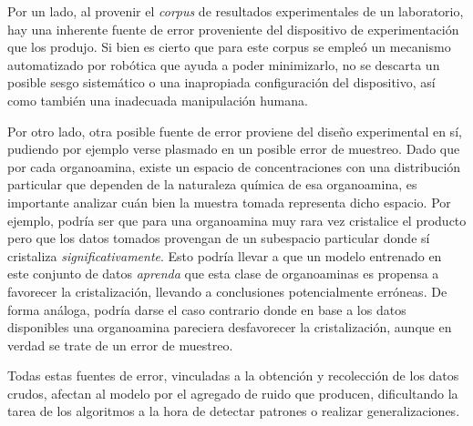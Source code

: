 
Por un lado, al provenir el \textit{corpus} de resultados experimentales de un laboratorio, hay una inherente fuente de error proveniente del dispositivo de experimentación que los produjo. Si bien es cierto que para este corpus se empleó un mecanismo automatizado por robótica que ayuda a poder minimizarlo, no se descarta un posible sesgo sistemático o una inapropiada configuración del dispositivo, así como también una inadecuada manipulación humana.

Por otro lado, otra posible fuente de error proviene del diseño experimental en sí, pudiendo por ejemplo verse plasmado en un posible error de muestreo. Dado que por cada organoamina, existe un espacio de concentraciones con una distribución particular que dependen de la naturaleza química de esa organoamina, es importante analizar cuán bien la muestra tomada representa dicho espacio. Por ejemplo, podría ser que para una organoamina muy rara vez cristalice el producto pero que los datos tomados provengan de un subespacio particular donde sí cristaliza \textit{significativamente}. Esto podría llevar a que un modelo entrenado en este conjunto de datos \textit{aprenda} que esta clase de organoaminas es propensa a favorecer la cristalización, llevando a conclusiones potencialmente erróneas. De forma análoga, podría darse el caso contrario donde en base a los datos disponibles una organoamina pareciera desfavorecer la cristalización, aunque en verdad se trate de un error de muestreo.

Todas estas fuentes de error, vinculadas a la obtención y recolección de los datos crudos, afectan al modelo por el agregado de ruido que producen, dificultando la tarea de los algoritmos a la hora de detectar patrones o realizar generalizaciones.  




